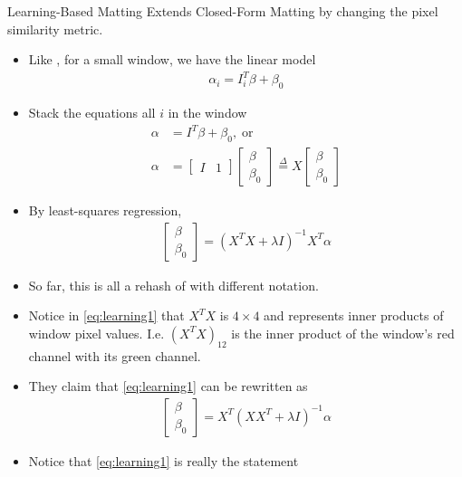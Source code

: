 \documentclass{beamer}
\providecommand{\defeq}{\stackrel{\Delta}{=}}
\begin{document}
\begin{frame}[allowframebreaks]{Learning-Based Matting \cite{zheng-learning}}
 Extends Closed-Form Matting by changing the pixel similarity metric.
 \begin{itemize}
  \item Like \cite{levin2008closed}, for a small window, we have the linear model
  \begin{align}
   \alpha_i =  I_i^T \beta + \beta_0
  \end{align}
  \item Stack the equations all $i$ in the window
  \begin{align}
   \alpha &=  I^T \beta + \beta_0, \; \text{or}\\
   \alpha &= \begin{bmatrix}I & 1\end{bmatrix} \begin{bmatrix} \beta \\ \beta_0 \end{bmatrix} \defeq X \begin{bmatrix} \beta \\ \beta_0 \end{bmatrix} \label{eq:alphacolor}
  \end{align}
  \item By least-squares regression,
  \begin{align}
   \begin{bmatrix} \beta \\ \beta_0 \end{bmatrix} = (X^TX+\lambda I)^{-1}X^T \alpha \label{eq:learning1}
  \end{align}
  \item So far, this is all a rehash of \cite{levin2008closed} with different notation.
  \item Notice in \eqref{eq:learning1} that $X^TX$ is $4 \times 4$ and
        represents inner products of window pixel values. I.e. $(X^TX)_{12}$
        is the inner product of the window's red channel with its green channel.
  \item They claim that \eqref{eq:learning1} can be rewritten as
  \begin{align}
   \begin{bmatrix} \beta \\ \beta_0 \end{bmatrix} = X^T(XX^T+\lambda I)^{-1} \alpha \label{eq:learning2}
  \end{align}
  \item Notice that \eqref{eq:learning1} is really the statement

\end{itemize}
\end{frame}
\end{document}
